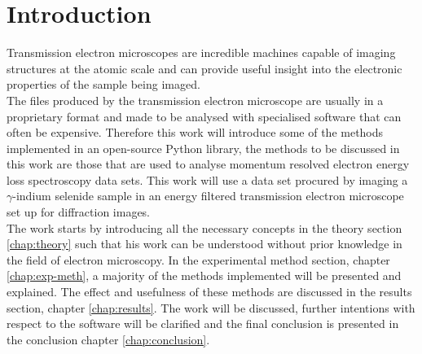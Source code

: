 \section{Introduction}
Transmission electron microscopes are incredible machines capable of imaging structures at the atomic scale and can provide useful insight into the electronic properties of the sample being imaged.\\
The files produced by the transmission electron microscope are usually in a proprietary format and made to be analysed with specialised software that can often be expensive. Therefore this work will introduce some of the methods implemented in an open-source Python library, the methods to be discussed in this work are those that are used to analyse momentum resolved electron energy loss spectroscopy data sets. This work will use a data set procured by imaging a $\gamma$-indium selenide sample in an energy filtered transmission electron microscope set up for diffraction images.\\
The work starts by introducing all the necessary concepts in the theory section \ref{chap:theory} such that his work can be understood without prior knowledge in the field of electron microscopy. In the experimental method section, chapter \ref{chap:exp-meth}, a majority of the methods implemented will be presented and explained. The effect and usefulness of these methods are discussed in the results section, chapter \ref{chap:results}. The work will be discussed, further intentions with respect to the software will be clarified and the final conclusion is presented in the conclusion chapter \ref{chap:conclusion}.





